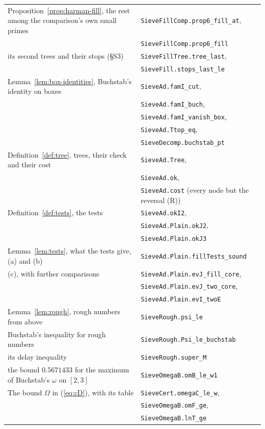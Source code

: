 \documentclass[11pt]{article}
\theoremstyle{definition}
\newcommand{\lean}[1]{\texttt{#1}}
\begin{document}
{\begin{longtable}{@{}>{\raggedright\arraybackslash}p{}l@{}}
Proposition~\ref{prop:harman-fill}, the rest among the comparison's own small primes &
\lean{SieveFillComp.prop6\_fill\_at}, \\
 & \lean{SieveFillComp.prop6\_fill} \\
\quad its second trees and their stops (\S S3) & \lean{SieveFillTree.tree\_last}, \\
 & \lean{SieveFill.stops\_last\_le} \\
Lemma~\ref{lem:box-identities}, Buchstab's identity on boxes & \lean{SieveAd.famI\_cut}, \\
 & \lean{SieveAd.famI\_buch}, \\
 & \lean{SieveAd.famI\_vanish\_box}, \\
 & \lean{SieveAd.Ttop\_eq}, \\
 & \lean{SieveDecomp.buchstab\_pt} \\
Definition~\ref{def:tree}, trees, their check and their cost & \lean{SieveAd.Tree}, \\
 & \lean{SieveAd.ok}, \\
 & \lean{SieveAd.cost} (every node but the reversal (R)) \\
Definition~\ref{def:tests}, the tests & \lean{SieveAd.okI2}, \\
 & \lean{SieveAd.Plain.okJ2}, \\
 & \lean{SieveAd.Plain.okJ3} \\
Lemma~\ref{lem:tests}, what the tests give, (a) and (b) & \lean{SieveAd.Plain.fillTests\_sound} \\
\quad (c), with further comparisons & \lean{SieveAd.Plain.evJ\_fill\_core}, \\
 & \lean{SieveAd.Plain.evJ\_two\_core}, \\
 & \lean{SieveAd.Plain.evI\_twoE} \\
Lemma~\ref{lem:rough}, rough numbers from above & \lean{SieveRough.psi\_le} \\
\quad Buchstab's inequality for rough numbers & \lean{SieveRough.Psi\_le\_buchstab} \\
\quad its delay inequality & \lean{SieveRough.super\_M} \\
\quad the bound $0.5671433$ for the maximum of Buchstab's $\omega$ on $[2, 3]$ & \lean{SieveOmegaB.omB\_le\_w1} \\
The bound $\Omega$ in (\ref{eq:cD}), with its table & \lean{SieveCert.omegaC\_le\_w}, \\
 & \lean{SieveOmegaB.omF\_ge}, \\
 & \lean{SieveOmegaB.lnT\_ge} \\

\end{longtable}}
\end{document}
